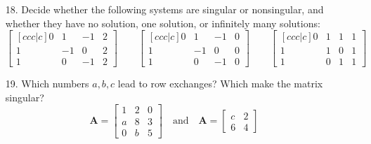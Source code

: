 \begin{itemize}
\begin{itemize}
      \item[18.] Decide whether the following systems are singular or
        nonsingular, and whether they have no solution, one solution, or
        infinitely many solutions:
        \[%
        \begin{bmatrix}[ccc|c]
        0 & 1 & -1 & 2 \\
        1 & -1 & 0 & 2 \\
        1 & 0 & -1 & 2
        \end{bmatrix} \qquad
        \begin{bmatrix}[ccc|c]
        0 & 1 & -1 & 0 \\
        1 & -1 & 0 & 0 \\
        1 & 0 & -1 & 0
        \end{bmatrix} \qquad
        \begin{bmatrix}[ccc|c]
        0 & 1 & 1 & 1 \\
        1 & 1 & 0 & 1 \\
        1 & 0 & 1 & 1
        \end{bmatrix}
        \]%

      \item[19.] Which numbers \(a, b, c\) lead to row exchanges? Which make the
        matrix singular?
        \[%
        \bm{A} = \begin{bmatrix}
        1 & 2 & 0  \\
        a & 8 & 3 \\
        0 & b & 5
        \end{bmatrix}\quad\text{and}\quad
        \bm{A} = \begin{bmatrix}
        c & 2 \\
        6 & 4
        \end{bmatrix}
        \]%

    \end{itemize}


\end{itemize}
